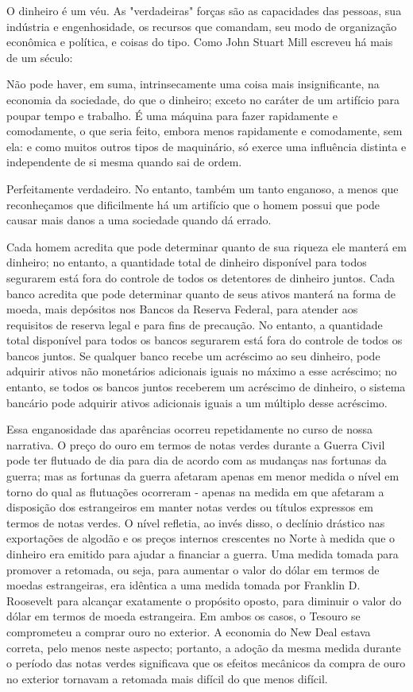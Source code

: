 \documentclass[a4paper,12pt]{article}[abntex2]
\begin{document}
O dinheiro é um véu. As "verdadeiras" forças são as capacidades das pessoas, sua indústria e engenhosidade, os recursos que comandam, seu modo de organização econômica e política, e coisas do tipo. Como John Stuart Mill escreveu há mais de um século:

Não pode haver, em suma, intrinsecamente uma coisa mais insignificante, na economia da sociedade, do que o dinheiro; exceto no caráter de um artifício para poupar tempo e trabalho. É uma máquina para fazer rapidamente e comodamente, o que seria feito, embora menos rapidamente e comodamente, sem ela: e como muitos outros tipos de maquinário, só exerce uma influência distinta e independente de si mesma quando sai de ordem.

Perfeitamente verdadeiro. No entanto, também um tanto enganoso, a menos que reconheçamos que dificilmente há um artifício que o homem possui que pode causar mais danos a uma sociedade quando dá errado.

Cada homem acredita que pode determinar quanto de sua riqueza ele manterá em dinheiro; no entanto, a quantidade total de dinheiro disponível para todos segurarem está fora do controle de todos os detentores de dinheiro juntos. Cada banco acredita que pode determinar quanto de seus ativos manterá na forma de moeda, mais depósitos nos Bancos da Reserva Federal, para atender aos requisitos de reserva legal e para fins de precaução. No entanto, a quantidade total disponível para todos os bancos segurarem está fora do controle de todos os bancos juntos. Se qualquer banco recebe um acréscimo ao seu dinheiro, pode adquirir ativos não monetários adicionais iguais no máximo a esse acréscimo; no entanto, se todos os bancos juntos receberem um acréscimo de dinheiro, o sistema bancário pode adquirir ativos adicionais iguais a um múltiplo desse acréscimo.

Essa enganosidade das aparências ocorreu repetidamente no curso de nossa narrativa. O preço do ouro em termos de notas verdes durante a Guerra Civil pode ter flutuado de dia para dia de acordo com as mudanças nas fortunas da guerra; mas as fortunas da guerra afetaram apenas em menor medida o nível em torno do qual as flutuações ocorreram - apenas na medida em que afetaram a disposição dos estrangeiros em manter notas verdes ou títulos expressos em termos de notas verdes. O nível refletia, ao invés disso, o declínio drástico nas exportações de algodão e os preços internos crescentes no Norte à medida que o dinheiro era emitido para ajudar a financiar a guerra.
Uma medida tomada para promover a retomada, ou seja, para aumentar o valor do dólar em termos de moedas estrangeiras, era idêntica a uma medida tomada por Franklin D. Roosevelt para alcançar exatamente o propósito oposto, para diminuir o valor do dólar em termos de moeda estrangeira. Em ambos os casos, o Tesouro se comprometeu a comprar ouro no exterior.
A economia do New Deal estava correta, pelo menos neste aspecto; portanto, a adoção da mesma medida durante o período das notas verdes significava que os efeitos mecânicos da compra de ouro no exterior tornavam a retomada mais difícil do que menos difícil.
\end{document}
